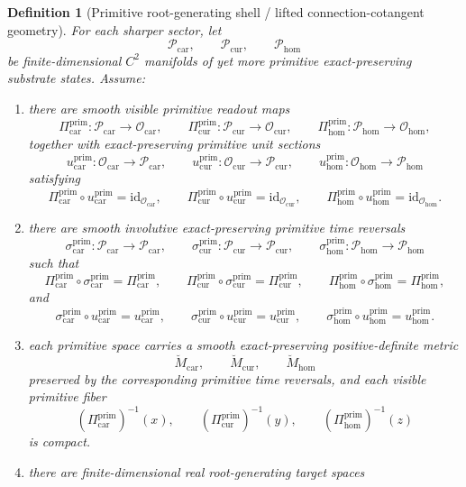 \documentclass[11pt]{article}
\newcommand{\TensorObjClass}{\mathcal O_{\mathrm{car}}}
\newcommand{\CurObjClass}{\mathcal O_{\mathrm{cur}}}
\newcommand{\HomObjClass}{\mathcal O_{\mathrm{hom}}}
\newcommand{\TensorPrimitiveSpace}{\mathcal P_{\mathrm{car}}}
\newcommand{\CurPrimitiveSpace}{\mathcal P_{\mathrm{cur}}}
\newcommand{\HomPrimitiveSpace}{\mathcal P_{\mathrm{hom}}}
\newcommand{\TensorPrimitiveRead}{\Pi_{\mathrm{car}}^{\mathrm{prim}}}
\newcommand{\CurPrimitiveRead}{\Pi_{\mathrm{cur}}^{\mathrm{prim}}}
\newcommand{\HomPrimitiveRead}{\Pi_{\mathrm{hom}}^{\mathrm{prim}}}
\newcommand{\TensorPrimitiveUnit}{u_{\mathrm{car}}^{\mathrm{prim}}}
\newcommand{\CurPrimitiveUnit}{u_{\mathrm{cur}}^{\mathrm{prim}}}
\newcommand{\HomPrimitiveUnit}{u_{\mathrm{hom}}^{\mathrm{prim}}}
\newcommand{\TensorPrimitiveTimeRev}{\sigma_{\mathrm{car}}^{\mathrm{prim}}}
\newcommand{\CurPrimitiveTimeRev}{\sigma_{\mathrm{cur}}^{\mathrm{prim}}}
\newcommand{\HomPrimitiveTimeRev}{\sigma_{\mathrm{hom}}^{\mathrm{prim}}}
\newcommand{\TensorPrimitiveSpaceMetric}{\breve M_{\mathrm{car}}}
\newcommand{\CurPrimitiveSpaceMetric}{\breve M_{\mathrm{cur}}}
\newcommand{\HomPrimitiveSpaceMetric}{\breve M_{\mathrm{hom}}}
\newtheorem{definition}{Definition}
\begin{document}
\begin{definition}[Primitive root-generating shell / lifted connection-cotangent geometry]
\label{def:primitive_geometry}
For each sharper sector, let
\[
\TensorPrimitiveSpace,\qquad
\CurPrimitiveSpace,\qquad
\HomPrimitiveSpace
\]
be finite-dimensional \(C^2\) manifolds of yet more primitive exact-preserving substrate states. Assume:
\begin{enumerate}
    \item there are smooth visible primitive readout maps
    \[
    \TensorPrimitiveRead:\TensorPrimitiveSpace\to\TensorObjClass,\qquad
    \CurPrimitiveRead:\CurPrimitiveSpace\to\CurObjClass,\qquad
    \HomPrimitiveRead:\HomPrimitiveSpace\to\HomObjClass,
    \]
    together with exact-preserving primitive unit sections
    \[
    \TensorPrimitiveUnit:\TensorObjClass\to\TensorPrimitiveSpace,\qquad
    \CurPrimitiveUnit:\CurObjClass\to\CurPrimitiveSpace,\qquad
    \HomPrimitiveUnit:\HomObjClass\to\HomPrimitiveSpace
    \]
    satisfying
    \[
    \TensorPrimitiveRead\circ\TensorPrimitiveUnit=\mathrm{id}_{\TensorObjClass},\qquad
    \CurPrimitiveRead\circ\CurPrimitiveUnit=\mathrm{id}_{\CurObjClass},\qquad
    \HomPrimitiveRead\circ\HomPrimitiveUnit=\mathrm{id}_{\HomObjClass}.
    \]
    \item there are smooth involutive exact-preserving primitive time reversals
    \[
    \TensorPrimitiveTimeRev:\TensorPrimitiveSpace\to\TensorPrimitiveSpace,\qquad
    \CurPrimitiveTimeRev:\CurPrimitiveSpace\to\CurPrimitiveSpace,\qquad
    \HomPrimitiveTimeRev:\HomPrimitiveSpace\to\HomPrimitiveSpace
    \]
    such that
    \[
    \TensorPrimitiveRead\circ\TensorPrimitiveTimeRev=\TensorPrimitiveRead,\qquad
    \CurPrimitiveRead\circ\CurPrimitiveTimeRev=\CurPrimitiveRead,\qquad
    \HomPrimitiveRead\circ\HomPrimitiveTimeRev=\HomPrimitiveRead,
    \]
    and
    \[
    \TensorPrimitiveTimeRev\circ\TensorPrimitiveUnit=\TensorPrimitiveUnit,\qquad
    \CurPrimitiveTimeRev\circ\CurPrimitiveUnit=\CurPrimitiveUnit,\qquad
    \HomPrimitiveTimeRev\circ\HomPrimitiveUnit=\HomPrimitiveUnit.
    \]
    \item each primitive space carries a smooth exact-preserving positive-definite metric
    \[
    \TensorPrimitiveSpaceMetric,\qquad
    \CurPrimitiveSpaceMetric,\qquad
    \HomPrimitiveSpaceMetric
    \]
    preserved by the corresponding primitive time reversals, and each visible primitive fiber
    \[
    (\TensorPrimitiveRead)^{-1}(x),\qquad
    (\CurPrimitiveRead)^{-1}(y),\qquad
    (\HomPrimitiveRead)^{-1}(z)
    \]
    is compact.
    \item there are finite-dimensional real root-generating target spaces

\end{enumerate}
\end{definition}
\end{document}
